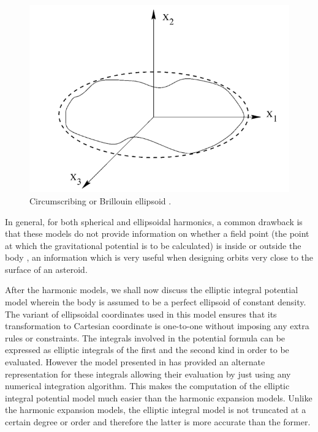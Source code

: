 %
\begin{figure}[h]
\centering
\captionsetup{justification=centering}
\includegraphics[scale=0.5]{circum_ellipsoid.png}
\caption{Circumscribing or Brillouin ellipsoid \cite{ellipse_main}.}
\label{fig:circum_ellip}
\end{figure}
\FloatBarrier
%

In general, for both spherical and ellipsoidal harmonics, a common drawback is that these models do not provide information on whether a field point (the point at which the gravitational potential is to be calculated) is inside or outside the body \cite{dan_poly}, an information which is very useful when designing orbits very close to the surface of an asteroid.

After the harmonic models, we shall now discuss the elliptic integral potential model wherein the body is assumed to be a perfect ellipsoid of constant density. The variant of ellipsoidal coordinates used in this model ensures that its transformation to Cartesian coordinate is one-to-one without imposing any extra rules or constraints. The integrals involved in the potential formula can be expressed as elliptic integrals of the first and the second kind in order to be evaluated. However the model presented in  has provided an alternate representation for these integrals allowing their evaluation by just using any numerical integration algorithm. This makes the computation of the elliptic integral potential model much easier than the harmonic expansion models. Unlike the harmonic expansion models, the elliptic integral model is not truncated at a certain degree or order and therefore the latter is more accurate than the former.


